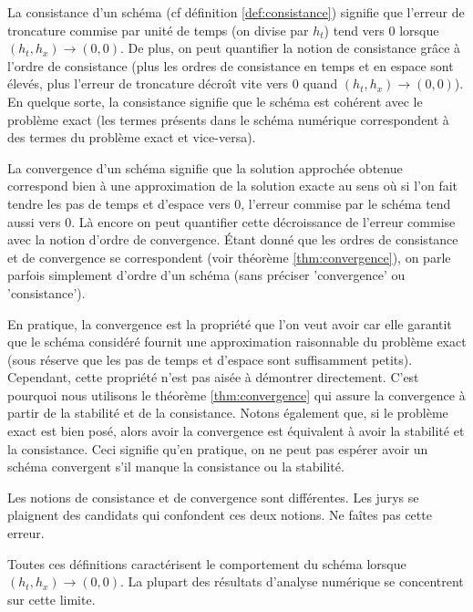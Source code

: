 \documentclass[12pt,a4paper,twoside]{article}
\begin{document}
La consistance d'un sch\'ema (cf d\'efinition \ref{def:consistance})
signifie que l'erreur de troncature commise par unit\'e de temps
(on divise par $h_t$) tend vers $0$ lorsque $(h_t,h_x) \to (0,0)$.
De plus, on peut quantifier la notion de consistance
gr\^ace \`a l'ordre de consistance 
(plus les ordres de consistance en temps et en espace sont \'elev\'es,
plus l'erreur de troncature d\'ecro\^it vite vers $0$ quand $(h_t,h_x) \to (0,0)$).
En quelque sorte, la consistance signifie que le sch\'ema est
coh\'erent avec le probl\`eme exact 
(les termes pr\'esents dans le sch\'ema num\'erique correspondent
\`a des termes du probl\`eme exact et vice-versa).


La convergence d'un sch\'ema signifie que la solution approch\'ee obtenue
correspond bien \`a une approximation de la solution exacte
au sens o\`u si l'on fait tendre les pas de temps et d'espace vers
$0$, l'erreur commise par le sch\'ema tend aussi vers $0$.
L\`a encore on peut quantifier cette d\'ecroissance de l'erreur commise 
avec la notion d'ordre de convergence.
\'Etant donn\'e que les ordres de consistance et de convergence 
se correspondent (voir th\'eor\`eme \ref{thm:convergence}), 
on parle parfois simplement d'ordre d'un sch\'ema
(sans pr\'eciser 'convergence' ou 'consistance').


En pratique, la convergence est la propri\'et\'e que l'on veut avoir
car elle garantit que le sch\'ema consid\'er\'e fournit une approximation
raisonnable du probl\`eme exact (sous r\'eserve que les pas de temps
et d'espace sont suffisamment petits).
Cependant, cette propri\'et\'e n'est pas ais\'ee \`a d\'emontrer directement.
C'est pourquoi nous utilisons le th\'eor\`eme \ref{thm:convergence}
qui assure la convergence \`a partir de la stabilit\'e et 
de la consistance.
Notons \'egalement que, si le probl\`eme exact est bien pos\'e,
alors avoir la convergence est \'equivalent \`a avoir
la stabilit\'e et la consistance.
Ceci signifie qu'en pratique, on ne peut pas esp\'erer avoir un sch\'ema convergent
s'il manque la consistance ou la stabilit\'e.


\begin{remark}
  Les notions de consistance et de convergence sont diff\'erentes.
  Les jurys se plaignent des candidats qui confondent ces deux
  notions.
  Ne fa\^ites pas cette erreur.
\end{remark}

\begin{remark}
  Toutes ces d\'efinitions caract\'erisent le comportement du sch\'ema 
  lorsque $(h_t,h_x) \to (0,0)$.
  La plupart des r\'esultats d'analyse num\'erique se concentrent sur cette limite.
\end{remark}
\end{document}
